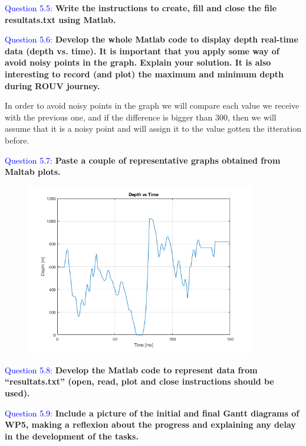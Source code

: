 \documentclass[12pt, a4papre]{article}
\begin{document}
	
	\textcolor{blue}{Question 5.5:} \textbf{Write the instructions to create, fill and close the file resultats.txt using Matlab.}
		
	
	
	\textcolor{blue}{Question 5.6:} \textbf{Develop the whole Matlab code to display depth real-time data (depth vs. time). It is important that you apply some way of avoid noisy points in the graph. Explain your solution. It is also interesting to record (and plot) the maximum and minimum depth during ROUV journey.}
	
	In order to avoid noisy points in the graph we will compare each value we receive with the previous one, and if the difference is bigger than 300, then we will assume that it is a noisy point and will assign it to the value gotten the itteration before.
	
	
	
	\textcolor{blue}{Question 5.7:} \textbf{Paste a couple of representative graphs obtained from Maltab plots.}
	
	\begin{figure}[H]
		\begin{center}
		\includegraphics[width=100mm]{pregunta5_7.png}
		\end{center}
	\end{figure}
	
	\textcolor{blue}{Question 5.8:} \textbf{Develop the Matlab code to represent data from “resultats.txt” (open, read, plot and close instructions should be used).}
	
	
	
	\textcolor{blue}{Question 5.9:} \textbf{Include a picture of the initial and final Gantt diagrams of WP5, making a reflexion about the progress and explaining any delay in the development of the tasks.}
	
\end{document}
